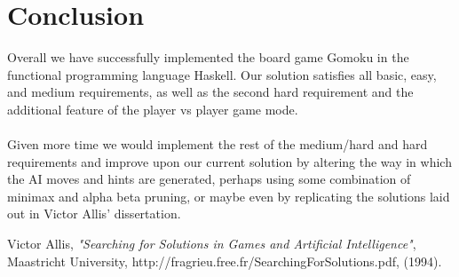 \documentclass[11]{article}
\begin{document}
	
\section{Conclusion}
	Overall we have successfully implemented the board game Gomoku in the functional programming language Haskell. Our solution satisfies all basic, easy, and medium requirements, as well as the second hard requirement and the additional feature of the player vs player game mode.\\\\Given more time we would implement the rest of the medium/hard and hard requirements and improve upon our current solution by altering the way in which the AI moves and hints are generated, perhaps using some combination of minimax and alpha beta pruning, or maybe even by replicating the solutions laid out in Victor Allis' dissertation.


  	\begin{thebibliography}{1}
  		 Victor Allis, 
  		\textit{"Searching for Solutions in Games and Artificial Intelligence"}, 
  		Maastricht University, 
  		http://fragrieu.free.fr/SearchingForSolutions.pdf, 
  		(1994).
  	\end{thebibliography}
\end{document}
